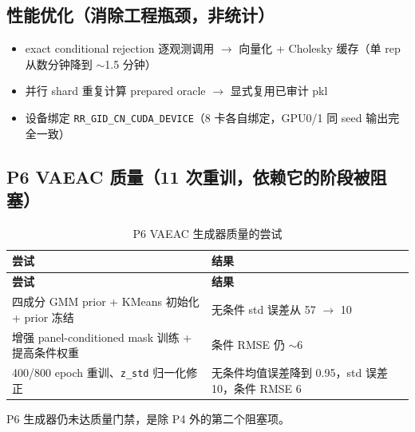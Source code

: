 \documentclass[11pt,a4paper]{ctexart}
\newcommand{\hcell}[1]{\textcolor{hlblue!85!black}{\bfseries #1}}
\begin{document}
\subsection{性能优化（消除工程瓶颈，非统计）}
\begin{itemize}
  \item exact conditional rejection 逐观测调用 $\rightarrow$ 向量化 + Cholesky 缓存（单 rep 从数分钟降到 $\sim$1.5 分钟）
  \item 并行 shard 重复计算 prepared oracle $\rightarrow$ 显式复用已审计 pkl
  \item 设备绑定 \texttt{RR\_GID\_CN\_CUDA\_DEVICE}（8 卡各自绑定，GPU0/1 同 seed 输出完全一致）
\end{itemize}

\subsection{P6 VAEAC 质量（11 次重训，依赖它的阶段被阻塞）}
\begin{longtable}{@{}L{7.2cm}L{7.4cm}@{}}
  \caption{P6 VAEAC 生成器质量的尝试}\label{tbl:p6}\\
  \toprule[1.4pt]
  \hcell{尝试} & \hcell{结果} \\
  \midrule[0.8pt]
  \endfirsthead
  \toprule[1.4pt]
  \hcell{尝试} & \hcell{结果} \\
  \midrule[0.8pt]
  \endhead
  \bottomrule[1.4pt]
  \endfoot
  四成分 GMM prior + KMeans 初始化 + prior 冻结 & 无条件 std 误差从 57 $\rightarrow$ 10 \\
  增强 panel-conditioned mask 训练 + 提高条件权重 & 条件 RMSE 仍 $\sim$6 \\
  400/800 epoch 重训、\texttt{z\_std} 归一化修正 & 无条件均值误差降到 0.95，std 误差 10，条件 RMSE 6 \\
  \bottomrule[1.4pt]
\end{longtable}

P6 生成器仍未达质量门禁，是除 P4 外的第二个阻塞项。

\end{document}
